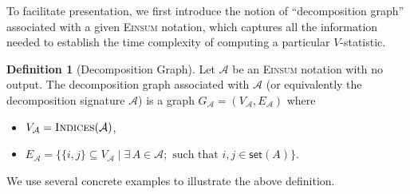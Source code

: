 \documentclass[12pt]{article}
\theoremstyle{plain}
\theoremstyle{definition}
\newtheorem{definition}{Definition}
\newtheorem{remark}{Remark}
\def\Einsum{\textsc{Einsum}}
\newcommand{\takesetp}[1]{\mathsf{set}(#1)}
\newcommand{\indexset}{\textsc{Indices}}
\newcommand{\graphform}[1]{G_{#1}}
\newcommand{\Lin}[1]{{\color{purple}{#1}}}
\def\calA{\mathcal{A}}
\begin{document}
\begin{bibunit}[agsm]
To facilitate presentation, we first introduce the notion of ``decomposition graph'' associated with a given \Einsum{} notation, which captures all the information needed to establish the time complexity of computing a particular $V$-statistic.

\begin{definition}[Decomposition Graph]\label{def:graph_decomp}
Let $\calA$ be an \Einsum{} notation with no output. The decomposition graph associated with $\calA$ (or equivalently the decomposition signature $\calA$) is a graph $\graphform{\calA} = (V_{\calA}, E_{\calA})$ where
    \begin{itemize}
        \item $V_{\calA} = \indexset(\calA)$, 
        \item $E_{\calA} = \big\{ \{i, j\} \subseteq V_{\calA} \mid \exists \, A \in \calA; \text{ such that } i, j \in \takesetp{A} \big\}$.
    \end{itemize}
\end{definition}



We use several concrete examples to illustrate the above definition.


\end{bibunit}
\end{document}
